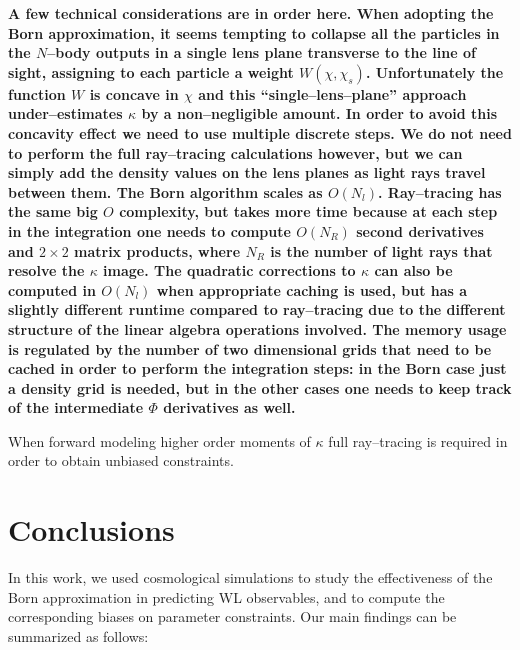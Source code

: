 \documentclass[reprint,aps,prd,superscriptaddress,showkeys,showpacs]{revtex4-1}
\begin{document}
\textbf{\color{blue} A few technical considerations are in order here. When adopting the Born approximation, it seems tempting to collapse all the particles in the $N$--body outputs in a single lens plane transverse to the line of sight, assigning to each particle a weight $W(\chi,\chi_s)$. Unfortunately the function $W$ is concave in $\chi$ and this ``single--lens--plane'' approach under--estimates $\kappa$ by a non--negligible amount. In order to avoid this concavity effect we need to use multiple discrete steps. We do not need to perform the full ray--tracing calculations however, but we can simply add the density values on the lens planes as light rays travel between them. The Born algorithm scales as $O(N_l)$. Ray--tracing has the same big $O$ complexity, but takes more time because at each step in the integration one needs to compute $O(N_R)$ second derivatives and $2\times 2$ matrix products, where $N_R$ is the number of light rays that resolve the $\kappa$ image. The quadratic corrections to $\kappa$ can also be computed in $O(N_l)$ when appropriate caching is used, but has a slightly different runtime compared to ray--tracing due to the different structure of the linear algebra operations involved. The memory usage is regulated by the number of two dimensional grids that need to be cached in order to perform the integration steps: in the Born case just a density grid is needed, but in the other cases one needs to keep track of the intermediate $\Phi$ derivatives as well.}

When forward modeling higher order moments of $\kappa$ full ray--tracing is required in order to obtain unbiased constraints.  


\section{Conclusions}
\label{sec:conclude}
%
In this work, we used cosmological simulations to study the effectiveness of the Born approximation in predicting WL observables, and to compute the corresponding biases on parameter constraints. Our main findings can be summarized as follows:
\end{document}
